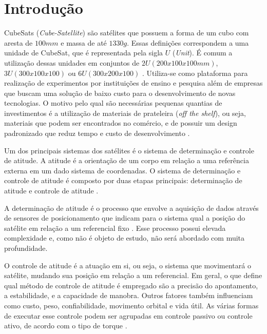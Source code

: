 \documentclass[
	12pt,				%
	openany,			%
	twoside,			%
	a4paper,			%
	english,			%
	french,				%
	spanish,			%
	brazil,				%
	oldfontcommands
	]{abntex2}
\begin{document}
\textual

\chapter[Introdução]{Introdução}

CubeSats (\textit{Cube-Satellite}) são satélites que possuem a forma de um cubo com aresta de $100mm$ e massa de até $1330g$. Essas definições correspondem a uma unidade de CubeSat, que é representada pela sigla $U$ (\textit{Unit}). É comum a utilização dessas unidades em conjuntos de $2U (200x100x100mm)$, $3U (300x100x100)$ ou $6U (300x200x100)$ \cite{NASA}. Utiliza-se como plataforma para realização de experimentos por instituições de ensino e pesquisa além de empresas que buscam uma solução de baixo custo para o desenvolvimento de novas tecnologias. O motivo pelo qual são necessárias pequenas quantias de investimentos é a utilização de materiais de prateleira (\textit{off the shelf}), ou seja, materiais que podem ser encontrados no comércio, e de possuir um design padronizado que reduz tempo e custo de desenvolvimento \cite{CalPoly}.

Um dos principais sistemas dos satélites é o sistema de determinação e controle de atitude. A atitude é a orientação de um corpo em relação a uma referência externa em um dado sistema de coordenadas. O sistema de determinação e controle de atitude é composto por duas etapas principais: determinação de atitude e controle de atitude \cite{FrancLav}.

A determinação de atitude é o processo que envolve a aquisição de dados através de sensores de posicionamento que indicam para o sistema qual a posição do satélite em relação a um referencial fixo \cite{FrancLav}. Esse processo possui elevada complexidade e, como não é objeto de estudo, não será abordado com muita profundidade.

O controle de atitude é a atuação em si, ou seja, o sistema que movimentará o satélite, mudando sua posição em relação a um referencial. Em geral, o que define qual método de controle de atitude é empregado são a precisão do apontamento, a estabilidade, e a capacidade de manobra. Outros fatores também influenciam como custo, peso, confiabilidade, movimento orbital e vida útil. As várias formas de executar esse controle podem ser agrupadas em controle passivo ou controle ativo, de acordo com o tipo de torque \cite{FrancLav}.
\end{document}

